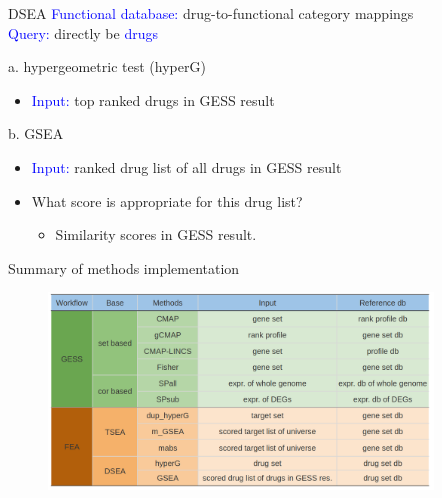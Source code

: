 \documentclass[10pt]{beamer}
\begin{document}
\begin{frame}{DSEA}
  \vspace{-0.5cm}
    \textcolor{blue}{Functional database:} drug-to-functional category mappings \\
    \textcolor{blue}{Query:} directly be \textcolor{blue}{drugs} \\
    \vspace{0.2cm}
    \begin{alertblock}{a. hypergeometric test (hyperG)}
        \begin{itemize}
            \item \textcolor{blue}{Input:} top ranked drugs in GESS result
        \end{itemize}
    \end{alertblock}
    \begin{alertblock}{b. GSEA}
        \begin{itemize}
            \item \textcolor{blue}{Input:} ranked drug list of all drugs in GESS result
            \item What score is appropriate for this drug list?
            \begin{itemize}
                \item Similarity scores in GESS result. \\
            \end{itemize}
        \end{itemize}
    \end{alertblock}
\end{frame}
\begin{frame}{Summary of methods implementation}
\vspace{-0.5cm}
  \begin{figure}
      \includegraphics[width=10.2cm]{demo/images/sum_imple.png}
  \end{figure}
\end{frame}
\end{document}
